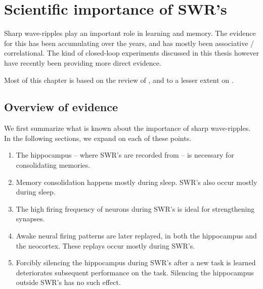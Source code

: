 \chapter{Scientific importance of SWR's}
\label{ch:science}

Sharp wave-ripples play an important role in learning and memory.\footnotemark{} The evidence for this has been accumulating over the years, and has mostly been associative / correlational. The kind of closed-loop experiments discussed in this thesis however have recently been providing more direct evidence.


Most of this chapter is based on the review of \citeauthor{Girardeau2011} \cite{Girardeau2011}, and to a lesser extent on \cite{Buzsaki1986,Buzsaki2015,Olafsdottir2018,Purves2017}.




\section{Overview of evidence}

We first summarize what is known about the importance of sharp wave-ripples. In the following sections, we expand on each of these points.

\begin{enumerate}
\item The hippocampus -- where SWR's are recorded from -- is necessary for consolidating memories.
\item Memory consolidation happens mostly during sleep. SWR's also occur mostly during sleep.
\item The high firing frequency of neurons during SWR's is ideal for strengthening synapses.
\item Awake neural firing patterns are later replayed, in both the hippocampus and the neocortex. These replays occur mostly during SWR's.
\item Forcibly silencing the hippocampus during SWR's after a new task is learned deteriorates subsequent performance on the task. Silencing the hippocampus outside SWR's has no such effect.
\end{enumerate}

